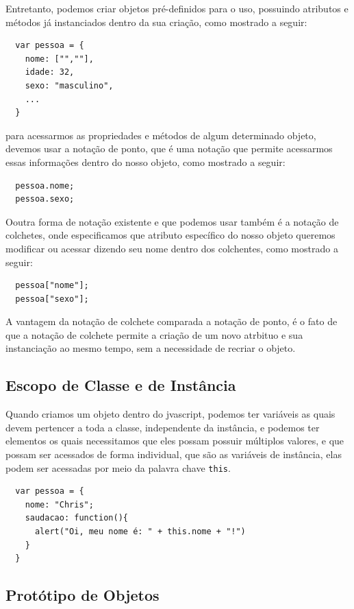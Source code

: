 \documentclass[12pt, a4paper]{paper}
\begin{document}
Entretanto, podemos criar objetos pré-definidos para o uso, possuindo atributos e 
métodos já instanciados dentro da sua criação, como mostrado a seguir: 

\begin{verbatim}
  var pessoa = {
    nome: ["",""],
    idade: 32,
    sexo: "masculino",
    ...
  }
\end{verbatim}

para acessarmos as propriedades e métodos de algum determinado objeto, devemos usar 
a notação de ponto, que é uma notação que permite acessarmos essas informações dentro 
do nosso objeto, como mostrado a seguir:

\begin{verbatim}
  pessoa.nome;
  pessoa.sexo;
\end{verbatim}

Ooutra forma de notação existente e que podemos usar também é a notação de colchetes,
onde especificamos que atributo específico do nosso objeto queremos modificar ou 
acessar dizendo seu nome dentro dos colchentes, como mostrado a seguir:

\begin{verbatim}
  pessoa["nome"];
  pessoa["sexo"];
\end{verbatim}

A vantagem da notação de colchete comparada a notação de ponto, é o fato de que a 
notação de colchete permite a criação de um novo atrbituo e sua instanciação ao mesmo 
tempo, sem a necessidade de recriar o objeto.

\subsection{Escopo de Classe e de Instância} %
\label{sub:Escopo de Classe e de Instância}
Quando criamos um objeto dentro do jvascript, podemos ter variáveis as quais devem 
pertencer a toda a classe, independente da instância, e podemos ter elementos os 
quais necessitamos que eles possam possuir múltiplos valores, e que possam ser 
acessados de forma individual, que são as variáveis de instância, elas podem ser 
acessadas por meio da palavra chave \texttt{this}. 

\begin{verbatim}
  var pessoa = {
    nome: "Chris";
    saudacao: function(){
      alert("Oi, meu nome é: " + this.nome + "!")
    }
  }
\end{verbatim}

\subsection{Protótipo de Objetos } %
\label{sub:Protótipo de Objetos }




\end{document}
